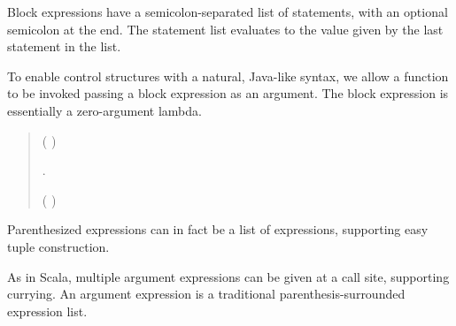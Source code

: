 Block expressions have a semicolon-separated list of statements, with
an optional semicolon at the end.  The statement list evaluates to the
value given by the last statement in the list.

\begin{quote}


 {}

 {} 

\end{quote}

To enable control structures with a natural, Java-like syntax, we allow
a function to be invoked passing a block expression as an argument.  The
block expression is essentially a zero-argument lambda.

\begin{quote}


 {}

 {}

 {}

 (  ) 

 {} . 

 {} 


 {} 





 (   ) 

\end{quote}

Parenthesized expressions can in fact be a list of expressions,
supporting easy tuple construction.%


As in Scala, multiple argument expressions can be given at a call
site, supporting currying.  An argument expression is a
traditional parenthesis-surrounded expression list.


